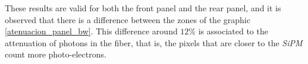 \documentclass[submitting]{nst}
\begin{document}
These results are valid for both the front panel and the rear panel, and it is observed that there is a difference between the zones of the graphic \ref{atenuacion_panel_bw}. This difference around $12$\% is associated to the attenuation of photons in the fiber, that is, the pixels that are closer to the \textsl{SiPM} count more photo-electrons. 






\end{document}
